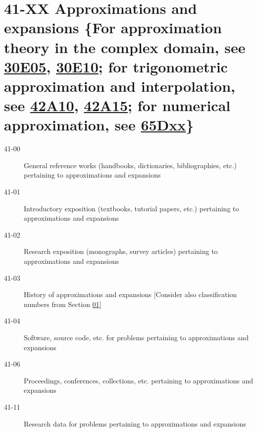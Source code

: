 \section*{41-XX Approximations and expansions \{For approximation theory in the complex domain, see \hyperref[30E05]{30E05}, \hyperref[30E10]{30E10}; for trigonometric approximation and interpolation, see \hyperref[42A10]{42A10}, \hyperref[42A15]{42A15}; for numerical approximation, see \hyperref[65Dxx]{65Dxx}\} }\label{41-XX}
\begin{description}
\item [41-00]\label{41-00} General reference works (handbooks, dictionaries, bibliographies, etc.) pertaining to approximations and expansions
\item [41-01]\label{41-01} Introductory exposition (textbooks, tutorial papers, etc.) pertaining to approximations and expansions
\item [41-02]\label{41-02} Research exposition (monographs, survey articles) pertaining to approximations and expansions
\item [41-03]\label{41-03} History of approximations and expansions [Consider also classification numbers from Section \hyperref[01-XX]{01}]
\item [41-04]\label{41-04} Software, source code, etc. for problems pertaining to approximations and expansions
\item [41-06]\label{41-06} Proceedings, conferences, collections, etc. pertaining to approximations and expansions
\item [41-11]\label{41-11} Research data for problems pertaining to approximations and expansions
\end{description}
